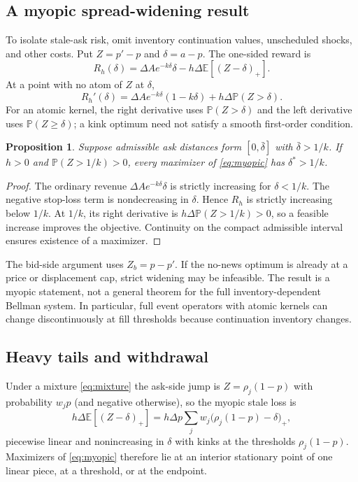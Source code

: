 \documentclass[11pt]{article}
\newcommand{\E}{\mathbb E}
\newcommand{\Prob}{\mathbb P}
\newcommand{\1}{\mathbf 1}
\newtheorem{proposition}{Proposition}
\begin{document}
\subsection{A myopic spread-widening result}
To isolate stale-ask risk, omit inventory continuation values, unscheduled
shocks, and other costs. Put $Z=p'-p$ and $\delta=a-p$. The one-sided reward is
\begin{equation}
 R_h(\delta)=\Delta Ae^{-k\delta}\delta
             -h\Delta\E[(Z-\delta)_+].
 \label{eq:myopic}
\end{equation}
At a point with no atom of $Z$ at $\delta$,
\begin{equation}
 R_h'(\delta)=\Delta Ae^{-k\delta}(1-k\delta)
             +h\Delta\Prob(Z>\delta).
\end{equation}
For an atomic kernel, the right derivative uses $\Prob(Z>\delta)$ and the
left derivative uses $\Prob(Z\ge\delta)$; a kink optimum need not satisfy a
smooth first-order condition.

\begin{proposition}
Suppose admissible ask distances form $[0,\bar\delta]$ with
$\bar\delta>1/k$. If $h>0$ and $\Prob(Z>1/k)>0$, every maximizer of
\eqref{eq:myopic} has $\delta^*>1/k$.
\end{proposition}
\begin{proof}
The ordinary revenue $\Delta Ae^{-k\delta}\delta$ is strictly increasing
for $\delta<1/k$. The negative stop-loss term is nondecreasing in $\delta$.
Hence $R_h$ is strictly increasing below $1/k$. At $1/k$, its right derivative
is $h\Delta\Prob(Z>1/k)>0$, so a feasible increase improves the objective.
Continuity on the compact admissible interval ensures existence of a maximizer.
\end{proof}

The bid-side argument uses $Z_b=p-p'$. If the no-news optimum is already
at a price or displacement cap, strict widening may be infeasible. The result
is a myopic statement, not a general theorem for the full inventory-dependent
Bellman system. In particular, full event operators with atomic kernels can
change discontinuously at fill thresholds because continuation inventory changes.

\subsection{Heavy tails and withdrawal}
\label{sec:withdraw}
Under a mixture \eqref{eq:mixture} the ask-side jump is $Z=\rho_j(1-p)$ with
probability $w_jp$ (and negative otherwise), so the myopic stale loss is
\begin{equation}
 h\Delta\E[(Z-\delta)_+]=h\Delta p\sum_jw_j\bigl(\rho_j(1-p)-\delta\bigr)_+,
\end{equation}
piecewise linear and nonincreasing in $\delta$ with kinks at the thresholds
$\rho_j(1-p)$. Maximizers of \eqref{eq:myopic} therefore lie at an interior
stationary point of one linear piece, at a threshold, or at the endpoint.
\end{document}
